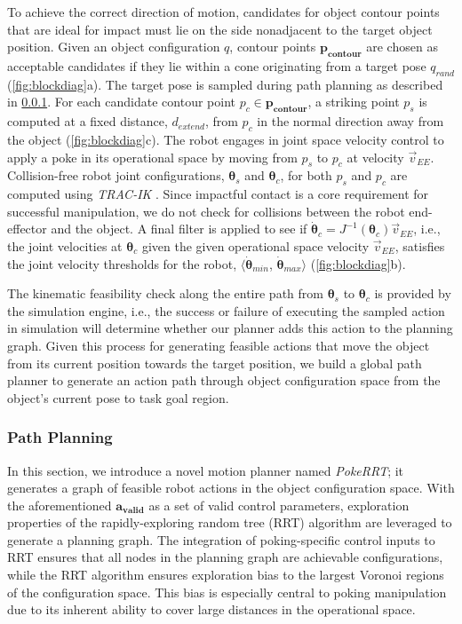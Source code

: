 To achieve the correct direction of motion, candidates for object contour points that are ideal for impact must lie on the side nonadjacent to the target object position. Given an object configuration $q$, contour points $\boldsymbol{p_{contour}}$ are chosen as acceptable candidates if they lie within a cone originating from a target pose $q_{rand}$ (\cref{fig:blockdiag}a). The target pose is sampled during path planning as described in \cref{sec:planners}.
For each candidate contour point $p_c \in \boldsymbol{p_{contour}}$, a striking point $p_s$ is computed at a fixed distance, $d_{extend}$, from $p_c$ in the normal direction away from the object (\cref{fig:blockdiag}c). The robot engages in joint space velocity control to apply a poke in its operational space by moving from $p_s$ to $p_c$ at velocity $\vec{v}_{EE}$. 
Collision-free robot joint configurations, $\boldsymbol{\theta}_s$ and $\boldsymbol{\theta}_c$, for both $p_s$ and $p_c$ are computed using \textsl{TRAC-IK} \cite{7363472}. Since impactful contact is a core requirement for successful manipulation, we do not check for collisions between the robot end-effector and the object.
A final filter is applied to see if $\boldsymbol{\dot{\theta}}_c = J^{-1}(\boldsymbol{\theta}_c)\vec{v}_{EE}$, i.e., the joint velocities at $\boldsymbol{\theta}_c$ given the given operational space velocity $\vec{v}_{EE}$, satisfies the joint velocity thresholds for the robot, $\langle\boldsymbol{\dot{\theta}}_{min}$, $\boldsymbol{\dot{\theta}}_{max}\rangle$ (\cref{fig:blockdiag}b). 

The kinematic feasibility check along the entire path from $\boldsymbol{\theta}_s$ to $\boldsymbol{\theta}_c$ is provided by the simulation engine, i.e., the success or failure of executing the sampled action in simulation will determine whether our planner adds this action to the planning graph.
Given this process for generating feasible actions that move the object from its current position towards the target position, we build a global path planner to generate an action path through object configuration space from the object's current pose to task goal region.

\subsubsection{Path Planning}\label{sec:planners}

In this section, we introduce a novel motion planner named \textsl{PokeRRT}; it generates a graph of feasible robot actions in the object configuration space.
With the aforementioned $\boldsymbol{a_{valid}}$ as a set of valid control parameters, exploration properties of the rapidly-exploring random tree (RRT) algorithm \cite{lavalle1998rapidly} are leveraged to generate a planning graph. The integration of poking-specific control inputs to RRT ensures that all nodes in the planning graph are achievable configurations, while the RRT algorithm ensures exploration bias to the largest Voronoi regions of the configuration space. This bias is especially central to poking manipulation due to its inherent ability to cover large distances in the operational space.

